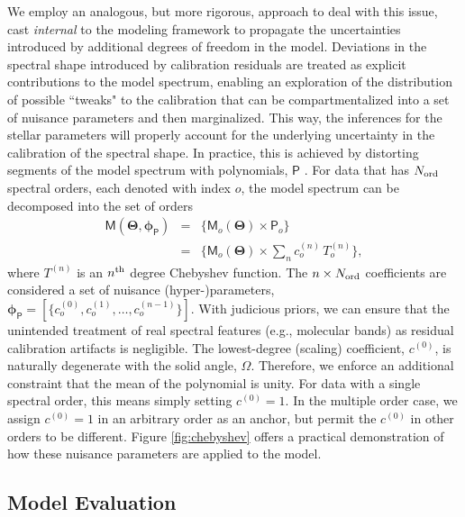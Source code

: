 \documentclass[iop,floatfix,numberedappendix,twocolappendix]{emulateapj}
\newcommand{\vM}{\mathsf{M}}
\newcommand{\vT}{ {\bm \Theta}}
\newcommand{\vp}{ {\bm \phi}}
\newcommand{\cheb}{ \vp_{\mathsf{P}}}
\begin{document}
We employ an analogous, but more rigorous, approach to deal with this issue, cast {\it internal} to 
the modeling framework to propagate the uncertainties introduced by additional degrees of freedom 
in the model.  Deviations in the spectral shape introduced by calibration residuals are treated as 
explicit contributions to the model spectrum, enabling an exploration of the distribution of 
possible ``tweaks" to the calibration that can be compartmentalized into a set of nuisance 
parameters and then marginalized.  This way, the inferences for the stellar parameters will 
properly account for the underlying uncertainty in the calibration of the spectral shape.  In 
practice, this is achieved by distorting segments of the model spectrum with polynomials, 
$\mathsf{P}$ \citep[e.g.,][]{eisenstein06,koleva09}.  For data that has $N_{\rm ord}$ spectral 
orders, each denoted with index $o$, the model spectrum can be decomposed into the set of orders
\begin{eqnarray} \label{eqn:chebyshev}
\vM(\vT, \cheb) &=& \{ \vM_o(\vT) \times \mathsf{P}_o \} \\
                &=& \{ \vM_o(\vT) \times \sum_n c_o^{(n)} \, T_o^{(n)} \}, \nonumber
\end{eqnarray}
where $T^{(n)}$ is an $n^{\rm th}$ degree Chebyshev function.  The $n \times N_{\rm ord}$ 
coefficients are considered a set of nuisance (hyper-)parameters, $\cheb = [\{c_o^{(0)}, c_o^{(1)}, 
\ldots, c_o^{(n-1)} \}]$.  With judicious priors, we can ensure that the unintended treatment of 
real spectral features (e.g., molecular bands) as residual calibration artifacts is negligible.  
The lowest-degree (scaling) coefficient, $c^{(0)}$, is naturally degenerate with the solid angle, 
$\Omega$.  Therefore, we enforce an additional constraint that the mean of the polynomial is 
unity.  For data with a single spectral order, this means simply setting $c^{(0)} = 1$.  In the 
multiple order case, we assign $c^{(0)} = 1$ in an arbitrary order as an anchor, but permit the 
$c^{(0)}$ in other orders to be different.  Figure \ref{fig:chebyshev} offers a practical 
demonstration of how these nuisance parameters are applied to the model. 


\subsection{Model Evaluation} \label{subsec:likelihood}
\end{document}
